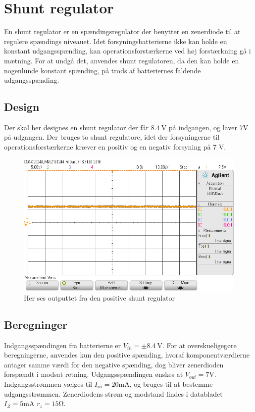 \section{Shunt regulator}\label{sec:shunt}
En shunt regulator er en spændingsregulator der benytter en zenerdiode til at regulere spændings niveauet.
Idet forsyningsbatterierne ikke kan holde en konstant udgangsspænding, kan operationsforstærkerne ved høj forstærkning gå i mætning. 
For at undgå det, anvendes shunt regulatoren, da den kan holde en nogenlunde konstant spænding, på trods af batteriernes faldende udgangsspænding.

\subsection{Design}
Der skal her designes en shunt regulator der får $\SI{8.4}{\volt}$ på indgangen, og laver $7\si{\volt}$ på udgangen.
Der bruges to shunt regulatore, idet der forsyningerne til operationsforstærkerne kræver en positiv og en negativ forsyning på 7 \si{\volt}.
\begin{figure}[h!]
	\centering
	\includegraphics[width=1\textwidth]{billeder/shunt_pos_png.png}
	\caption{Her ses outputtet fra den positive shunt regulator}
	\label{fig:positiv_shunt}
\end{figure}
\subsection{Beregninger}
Indgangsspændingen fra batterierne er $V_{in} = \pm \SI{8.4}{\volt}$. 
For at overskueligegøre beregningerne, anvendes kun den positive spænding, hvoraf komponentværdierne antager samme værdi for den negative spænding, dog bliver zenerdioden forspændt i modsat retning.
Udgangsspændingen ønskes at $V_{out} = 7 \si{\volt}$. 
Indgangsstrømmen vælges til $I_{in} = 20\si{\milli\ampere}$, og bruges til at bestemme udgangsstrømmen.
Zenerdiodens strøm og modstand findes i databladet $I_Z = 5 \si{\milli\ampere}$ $r_z = 15 \si{\ohm}$. \cite[Side. 1 Kolonne 12]{ZenerDiode}

